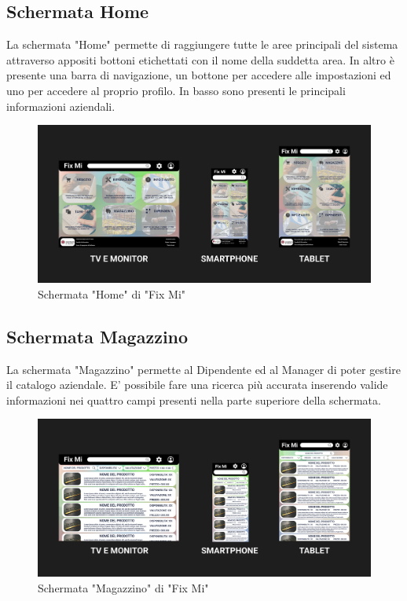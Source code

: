 \documentclass{report}
\begin{document}
\subsection*{Schermata Home}

La schermata "Home" permette di raggiungere tutte le aree principali del sistema attraverso appositi bottoni etichettati con il nome della suddetta area. In altro è presente una barra di navigazione, un bottone per accedere alle impostazioni ed uno per accedere al proprio profilo. In basso sono presenti le principali informazioni aziendali.

\begin{figure}[h]
	\centering
	\includegraphics[width=1\textwidth]{images/Snapshots/mainpage_snapshot.png}
	\caption{Schermata "Home" di "Fix Mi"}
\end{figure}	

\subsection*{Schermata Magazzino}
La schermata "Magazzino" permette al Dipendente ed al Manager di poter gestire il catalogo aziendale. E' possibile fare una ricerca più accurata inserendo valide informazioni nei quattro campi presenti nella parte superiore della schermata.

\begin{figure}[h]
	\centering
	\includegraphics[width=1\textwidth]{images/Snapshots/magazzino_snapshot.png}
	\caption{Schermata "Magazzino" di "Fix Mi"}
\end{figure}	
\end{document}
